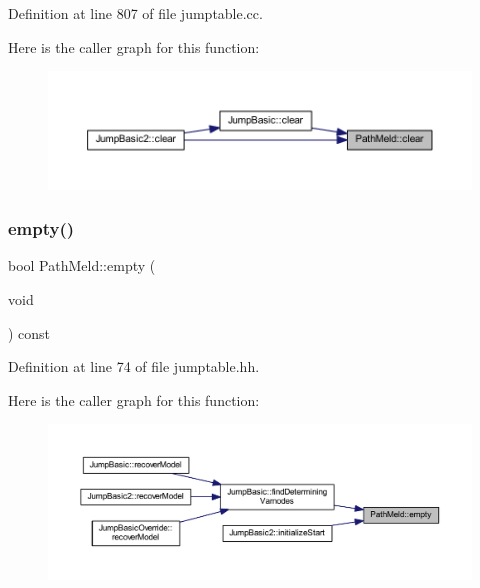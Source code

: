 Definition at line 807 of file jumptable.\+cc.

Here is the caller graph for this function\+:
\nopagebreak
\begin{figure}[H]
\begin{center}
\leavevmode
\includegraphics[width=350pt]{class_path_meld_a902af8ce7d496c1bcf34ed5e40b1be26_icgraph}
\end{center}
\end{figure}
\mbox{\label{class_path_meld_a129f73389540c04d27c1b8cfd927c136}} 
\subsubsection{\texorpdfstring{empty()}{empty()}}
{\footnotesize\ttfamily bool Path\+Meld\+::empty (\begin{DoxyParamCaption}\item[{void}]{ }\end{DoxyParamCaption}) const\hspace{0.3cm}{\ttfamily [inline]}}



Definition at line 74 of file jumptable.\+hh.

Here is the caller graph for this function\+:
\nopagebreak
\begin{figure}[H]
\begin{center}
\leavevmode
\includegraphics[width=350pt]{class_path_meld_a129f73389540c04d27c1b8cfd927c136_icgraph}
\end{center}
\end{figure}
\mbox{\label{class_path_meld_a991b7429bf694ad8c71fe74252ad0cdc}} 
